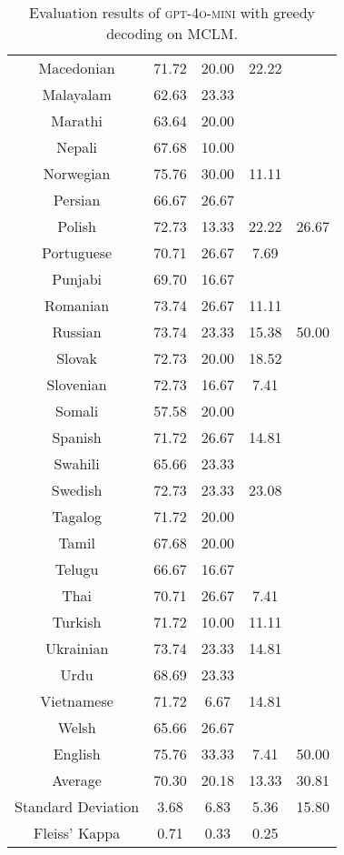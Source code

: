 \begin{table*}[]
\begin{tabular}{c|cccc}
Macedonian & 71.72 & 20.00 & 22.22 &  \\
Malayalam & 62.63 & 23.33 & \multicolumn{1}{l}{} &  \\
Marathi & 63.64 & 20.00 & \multicolumn{1}{l}{} &  \\
Nepali & 67.68 & 10.00 & \multicolumn{1}{l}{} &  \\
Norwegian & 75.76 & 30.00 & 11.11 &  \\
Persian & 66.67 & 26.67 & \multicolumn{1}{l}{} &  \\
Polish & 72.73 & 13.33 & 22.22 & 26.67 \\
Portuguese & 70.71 & 26.67 & 7.69 &  \\
Punjabi & 69.70 & 16.67 & \multicolumn{1}{l}{} &  \\
Romanian & 73.74 & 26.67 & 11.11 &  \\
Russian & 73.74 & 23.33 & 15.38 & 50.00 \\
Slovak & 72.73 & 20.00 & 18.52 &  \\
Slovenian & 72.73 & 16.67 & 7.41 &  \\
Somali & 57.58 & 20.00 & \multicolumn{1}{l}{} &  \\
Spanish & 71.72 & 26.67 & 14.81 &  \\
Swahili & 65.66 & 23.33 & \multicolumn{1}{l}{} &  \\
Swedish & 72.73 & 23.33 & 23.08 &  \\
Tagalog & 71.72 & 20.00 & \multicolumn{1}{l}{} &  \\
Tamil & 67.68 & 20.00 & \multicolumn{1}{l}{} &  \\
Telugu & 66.67 & 16.67 & \multicolumn{1}{l}{} &  \\
Thai & 70.71 & 26.67 & 7.41 &  \\
Turkish & 71.72 & 10.00 & 11.11 &  \\
Ukrainian & 73.74 & 23.33 & 14.81 &  \\
Urdu & 68.69 & 23.33 & \multicolumn{1}{l}{} &  \\
Vietnamese & 71.72 & 6.67 & 14.81 &  \\
Welsh & 65.66 & 26.67 & \multicolumn{1}{l}{} &  \\
\rowcolor[HTML]{FCE5CD} 
English & 75.76 & 33.33 & 7.41 & 50.00 \\ \midrule
Average & 70.30 & 20.18 & 13.33 & 30.81 \\
Standard Deviation & 3.68 & 6.83 & 5.36 & 15.80 \\
Fleiss' Kappa & 0.71 & 0.33 & 0.25 & \\ \bottomrule
\end{tabular}
\caption{\footnotesize Evaluation results of \textsc{gpt-4o-mini} with greedy decoding on MCLM.}
\label{tab:gpt_4o_mini_result}
\end{table*}

